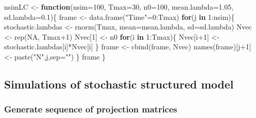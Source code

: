 \documentclass[
]{book}
\newenvironment{Shaded}{\begin{snugshade}}{\end{snugshade}}
\newcommand{\AttributeTok}[1]{\textcolor[rgb]{0.77,0.63,0.00}{#1}}
\newcommand{\ConstantTok}[1]{\textcolor[rgb]{0.00,0.00,0.00}{#1}}
\newcommand{\ControlFlowTok}[1]{\textcolor[rgb]{0.13,0.29,0.53}{\textbf{#1}}}
\newcommand{\DecValTok}[1]{\textcolor[rgb]{0.00,0.00,0.81}{#1}}
\newcommand{\FloatTok}[1]{\textcolor[rgb]{0.00,0.00,0.81}{#1}}
\newcommand{\FunctionTok}[1]{\textcolor[rgb]{0.00,0.00,0.00}{#1}}
\newcommand{\NormalTok}[1]{#1}
\newcommand{\OtherTok}[1]{\textcolor[rgb]{0.56,0.35,0.01}{#1}}
\newcommand{\SpecialCharTok}[1]{\textcolor[rgb]{0.00,0.00,0.00}{#1}}
\newcommand{\StringTok}[1]{\textcolor[rgb]{0.31,0.60,0.02}{#1}}
\begin{document}
\begin{Shaded}
\begin{Highlighting}[]
\NormalTok{nsimLC }\OtherTok{\textless{}{-}} \ControlFlowTok{function}\NormalTok{(}\AttributeTok{nsim=}\DecValTok{100}\NormalTok{, }\AttributeTok{Tmax=}\DecValTok{30}\NormalTok{, }\AttributeTok{n0=}\DecValTok{100}\NormalTok{, }\AttributeTok{mean.lambda=}\FloatTok{1.05}\NormalTok{, }\AttributeTok{sd.lambda=}\FloatTok{0.1}\NormalTok{)\{}
\NormalTok{  frame }\OtherTok{\textless{}{-}}  \FunctionTok{data.frame}\NormalTok{(}\StringTok{"Time"}\OtherTok{=}\DecValTok{0}\SpecialCharTok{:}\NormalTok{Tmax)}
  \ControlFlowTok{for}\NormalTok{(j }\ControlFlowTok{in} \DecValTok{1}\SpecialCharTok{:}\NormalTok{nsim)\{}
\NormalTok{  stochastic.lambdas }\OtherTok{\textless{}{-}} \FunctionTok{rnorm}\NormalTok{(Tmax, }\AttributeTok{mean=}\NormalTok{mean.lambda, }\AttributeTok{sd=}\NormalTok{sd.lambda)}
\NormalTok{  Nvec }\OtherTok{\textless{}{-}} \FunctionTok{rep}\NormalTok{(}\ConstantTok{NA}\NormalTok{, Tmax}\SpecialCharTok{+}\DecValTok{1}\NormalTok{)}
\NormalTok{  Nvec[}\DecValTok{1}\NormalTok{] }\OtherTok{\textless{}{-}}\NormalTok{ n0}
  \ControlFlowTok{for}\NormalTok{(i }\ControlFlowTok{in} \DecValTok{1}\SpecialCharTok{:}\NormalTok{Tmax)\{}
\NormalTok{    Nvec[i}\SpecialCharTok{+}\DecValTok{1}\NormalTok{] }\OtherTok{\textless{}{-}}\NormalTok{ stochastic.lambdas[i]}\SpecialCharTok{*}\NormalTok{Nvec[i]}
\NormalTok{  \}}
\NormalTok{  frame }\OtherTok{\textless{}{-}} \FunctionTok{cbind}\NormalTok{(frame, Nvec)}
  \FunctionTok{names}\NormalTok{(frame)[j}\SpecialCharTok{+}\DecValTok{1}\NormalTok{] }\OtherTok{\textless{}{-}} \FunctionTok{paste}\NormalTok{(}\StringTok{"N"}\NormalTok{,j,}\AttributeTok{sep=}\StringTok{""}\NormalTok{)}
\NormalTok{  \}}
\NormalTok{  frame}
\NormalTok{\}}
\end{Highlighting}
\end{Shaded}

\hypertarget{simulations-of-stochastic-structured-model}{%
\subsection{Simulations of stochastic structured model}\label{simulations-of-stochastic-structured-model}}

\hypertarget{generate-sequence-of-projection-matrices}{%
\subsubsection{Generate sequence of projection matrices}\label{generate-sequence-of-projection-matrices}}
\end{document}
